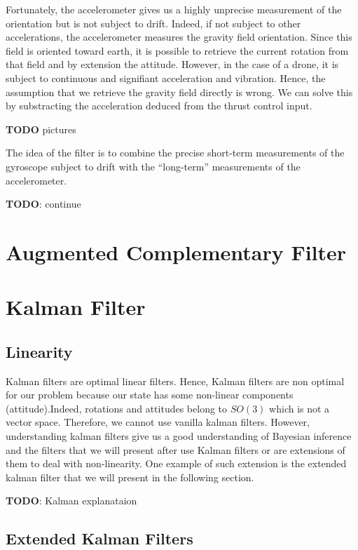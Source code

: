 \documentclass[]{article}
\begin{document}
Fortunately, the accelerometer gives us a highly unprecise measurement
of the orientation but is not subject to drift. Indeed, if not subject
to other accelerations, the accelerometer measures the gravity field
orientation. Since this field is oriented toward earth, it is possible
to retrieve the current rotation from that field and by extension the
attitude. However, in the case of a drone, it is subject to continuous
and signifiant acceleration and vibration. Hence, the assumption that we
retrieve the gravity field directly is wrong. We can solve this by
substracting the acceleration deduced from the thrust control input.

\textbf{TODO} pictures

The idea of the filter is to combine the precise short-term measurements
of the gyroscope subject to drift with the ``long-term'' measurements of
the accelerometer.

\textbf{TODO}: continue

\section{Augmented Complementary
Filter}\label{augmented-complementary-filter}

\section{Kalman Filter}\label{kalman-filter}

\subsection{Linearity}\label{linearity}

Kalman filters are optimal linear filters. Hence, Kalman filters are non
optimal for our problem because our state has some non-linear components
(attitude).Indeed, rotations and attitudes belong to \(SO(3)\) which is
not a vector space. Therefore, we cannot use vanilla kalman filters.
However, understanding kalman filters give us a good understanding of
Bayesian inference and the filters that we will present after use Kalman
filters or are extensions of them to deal with non-linearity. One
example of such extension is the extended kalman filter that we will
present in the following section.

\textbf{TODO}: Kalman explanataion

\subsection{Extended Kalman Filters}\label{extended-kalman-filters}
\end{document}
